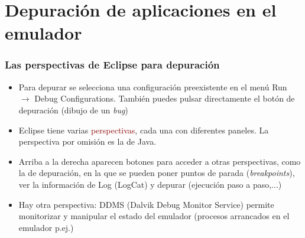 \documentclass[hyperref={pdfpagelabels=true},utf8x]{beamer}
\newcommand{\res}[1]{\textcolor{darkred}{#1}}
\newcommand{\dif}{\textsl}
\begin{document}
\section{Depuración de aplicaciones en el emulador}

\begin{frame}[fragile]
\frametitle{Las perspectivas de Eclipse para depuración}

\begin{itemize}
\item Para depurar se selecciona una configuración preexistente en el
  menú Run $\rightarrow$ Debug Configurations. También puedes pulsar
  directamente el botón de depuración (dibujo de un \emph{bug})

\item Eclipse tiene varias \res{perspectivas}, cada una con diferentes
paneles. La perspectiva por omisión es la de Java. 

\item Arriba a la derecha aparecen botones para acceder a otras
  perspectivas, como la de depuración, en la que se pueden poner
  puntos de parada (\dif{breakpoints}), ver la información de Log
  (LogCat) y depurar (ejecución paso a paso,...)

\item Hay otra perspectiva: DDMS (Dalvik Debug Monitor Service)
  permite monitorizar y manipular el estado del emulador (procesos
  arrancados en el emulador p.ej.)

\end{itemize}
\end{frame}
\end{document}
